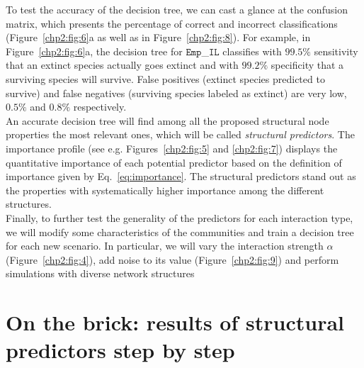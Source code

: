 To test the accuracy of the decision tree, we can cast a glance at the confusion matrix, which presents the percentage of correct and incorrect classifications (Figure~\ref{chp2:fig:6}a  as well as in Figure~\ref{chp2:fig:8}). For example, in Figure~\ref{chp2:fig:6}a, the decision tree for $\texttt{Emp}$\_$\texttt{IL}$ classifies with $99.5\%$ sensitivity that an extinct species actually goes extinct and with $99.2\%$ specificity that a surviving species will survive. False positives (extinct species predicted to survive) and false negatives (surviving species labeled as extinct) are very low, $0.5\%$ and $0.8\%$ respectively. \\

An accurate decision tree will find among all the proposed structural node properties the most relevant ones, which will be called \textit{structural predictors}. The importance profile (see e.g. Figures~\ref{chp2:fig:5}  and \ref{chp2:fig:7}) displays the quantitative importance of each potential predictor based on the definition of importance given by Eq.~\eqref{eq:importance}. The structural predictors stand out as the properties with systematically higher importance among the different structures. \\

Finally, to further test the generality of the predictors for each interaction type, we will modify some characteristics of the communities and train a decision tree for each new scenario. In particular, we will vary the interaction strength $\alpha$ (Figure~\ref{chp2:fig:4}), add noise to its value (Figure~\ref{chp2:fig:9}) and perform simulations with diverse network structures
\section{On the brick: results of structural predictors step by step}



